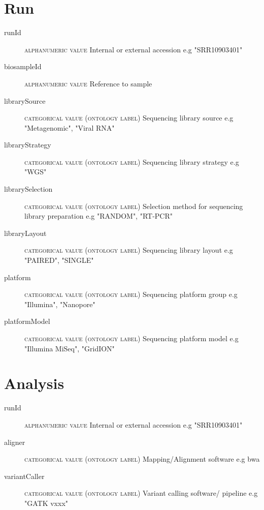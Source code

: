 \documentclass[a4paper, 10pt]{article}        %
\begin{document}
   \section*{ {\color{teal} Run}}
  
  \begin{description}
	\item[runId] {\textsc{alphanumeric value}}  Internal or external accession e.g "SRR10903401"
	\item[biosampleId] {\textsc{alphanumeric value}}  Reference to sample 	\item[librarySource] {\textsc{categorical value (ontology label)}}  Sequencing library source e.g "Metagenomic", "Viral RNA"
	\item[libraryStrategy]  {\textsc{categorical value (ontology label)}} Sequencing library strategy e.g "WGS"
	\item[librarySelection] {\textsc{categorical value (ontology label)}} Selection method for sequencing library preparation e.g "RANDOM", "RT-PCR"
	\item[libraryLayout] {\textsc{categorical value (ontology label)}}  Sequencing library layout e.g "PAIRED", "SINGLE"
	\item[platform] {\textsc{categorical value (ontology label)}} Sequencing platform group e.g "Illumina", "Nanopore"
	\item[platformModel] {\textsc{categorical value (ontology label)}} Sequencing platform model e.g "Illumina MiSeq", "GridION"
 \end{description}
 
 
 
   \section*{ {\color{teal} Analysis}}
  
  \begin{description}
	\item[runId] {\textsc{alphanumeric value}}  Internal or external accession e.g "SRR10903401"
	\item[aligner]  {\textsc{categorical value (ontology label)}} Mapping/Alignment software e.g bwa
	  \item[variantCaller]  {\textsc{categorical value (ontology label)}} Variant calling software/ pipeline e.g "GATK vxxx" %
 \end{description}
 
\end{document}

